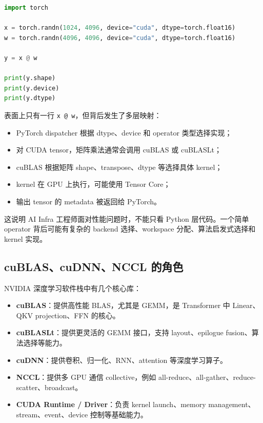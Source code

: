 \begin{lstlisting}[language=Python,caption={PyTorch CUDA Tensor 示例},label={lst:pytorch-cuda-tensor}]
import torch

x = torch.randn(1024, 4096, device="cuda", dtype=torch.float16)
w = torch.randn(4096, 4096, device="cuda", dtype=torch.float16)

y = x @ w

print(y.shape)
print(y.device)
print(y.dtype)
\end{lstlisting}

表面上只有一行 \texttt{x @ w}，但背后发生了多层映射：

\begin{itemize}
  \item PyTorch dispatcher 根据 dtype、device 和 operator 类型选择实现；
  \item 对 CUDA tensor，矩阵乘法通常会调用 cuBLAS 或 cuBLASLt；
  \item cuBLAS 根据矩阵 shape、transpose、dtype 等选择具体 kernel；
  \item kernel 在 GPU 上执行，可能使用 Tensor Core；
  \item 输出 tensor 的 metadata 被返回给 PyTorch。
\end{itemize}

这说明 AI Infra 工程师面对性能问题时，不能只看 Python 层代码。一个简单 operator 背后可能有复杂的 backend 选择、workspace 分配、算法启发式选择和 kernel 实现。

\subsection{cuBLAS、cuDNN、NCCL 的角色}
\label{subsec:cublas-cudnn-nccl}

NVIDIA 深度学习软件栈中有几个核心库：

\begin{itemize}
  \item \textbf{cuBLAS}：提供高性能 BLAS，尤其是 GEMM，是 Transformer 中 Linear、QKV projection、FFN 的核心。
  \item \textbf{cuBLASLt}：提供更灵活的 GEMM 接口，支持 layout、epilogue fusion、算法选择等能力。
  \item \textbf{cuDNN}：提供卷积、归一化、RNN、attention 等深度学习算子。
  \item \textbf{NCCL}：提供多 GPU 通信 collective，例如 all-reduce、all-gather、reduce-scatter、broadcast。
  \item \textbf{CUDA Runtime / Driver}：负责 kernel launch、memory management、stream、event、device 控制等基础能力。
\end{itemize}

